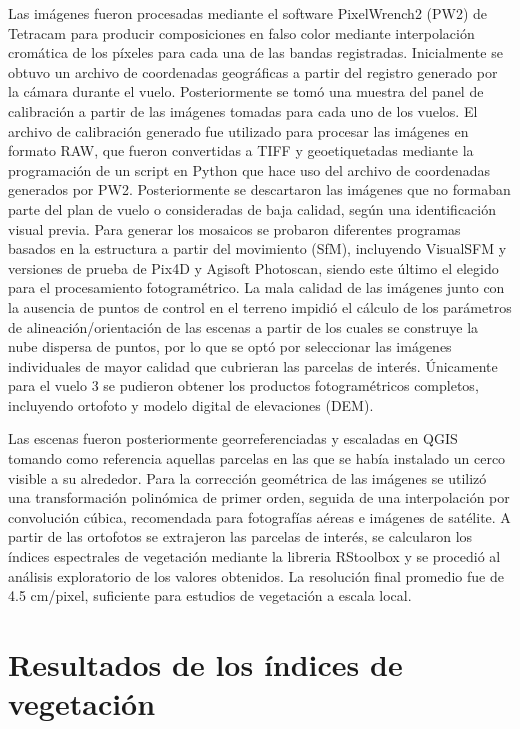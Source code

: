 \documentclass[spanish,openany]{article}
\begin{document}
Las imágenes fueron procesadas mediante el software PixelWrench2 (PW2)
de Tetracam para producir composiciones en falso color mediante
interpolación cromática de los píxeles para cada una de las bandas
registradas. Inicialmente se obtuvo un archivo de coordenadas
geográficas a partir del registro generado por la cámara durante el
vuelo. Posteriormente se tomó una muestra del panel de calibración a
partir de las imágenes tomadas para cada uno de los vuelos. El archivo
de calibración generado fue utilizado para procesar las imágenes en
formato RAW, que fueron convertidas a TIFF y geoetiquetadas mediante la
programación de un script en Python \citep{Jimenez2018} que hace uso del
archivo de coordenadas generados por PW2. Posteriormente se descartaron
las imágenes que no formaban parte del plan de vuelo o consideradas de
baja calidad, según una identificación visual previa. Para generar los
mosaicos se probaron diferentes programas basados en la estructura a
partir del movimiento (SfM), incluyendo VisualSFM y versiones de prueba
de Pix4D y Agisoft Photoscan, siendo este último el elegido para el
procesamiento fotogramétrico. La mala calidad de las imágenes junto con
la ausencia de puntos de control en el terreno impidió el cálculo de los
parámetros de alineación/orientación de las escenas a partir de los
cuales se construye la nube dispersa de puntos, por lo que se optó por
seleccionar las imágenes individuales de mayor calidad que cubrieran las
parcelas de interés. Únicamente para el vuelo 3 se pudieron obtener los
productos fotogramétricos completos, incluyendo ortofoto y modelo
digital de elevaciones (DEM).

Las escenas fueron posteriormente georreferenciadas y escaladas en QGIS
\citep{QGISDevelopmentTeam2017} tomando como referencia aquellas
parcelas en las que se había instalado un cerco visible a su alrededor.
Para la corrección geométrica de las imágenes se utilizó una
transformación polinómica de primer orden, seguida de una interpolación
por convolución cúbica, recomendada para fotografías aéreas e imágenes
de satélite. A partir de las ortofotos se extrajeron las parcelas de
interés, se calcularon los índices espectrales de vegetación mediante la
libreria RStoolbox \citep{R-base, RStoolbox} y se procedió al análisis
exploratorio de los valores obtenidos. La resolución final promedio fue
de 4.5 cm/pixel, suficiente para estudios de vegetación a escala local.

\section{Resultados de los índices de vegetación}\label{results}
\end{document}
